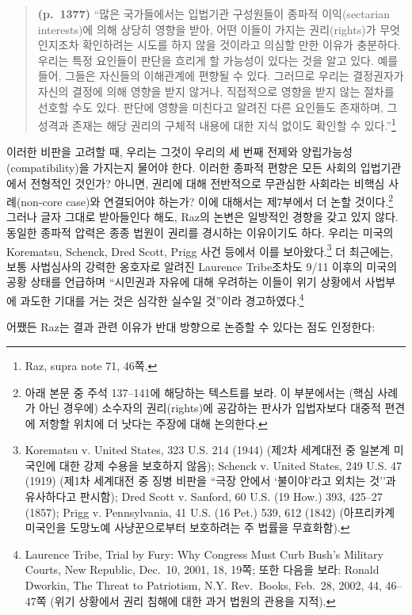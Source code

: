 \documentclass[a4paper,12pt,oneside]{article}  %
\begin{document}
\begin{quote}
\textbf{(p.~1377)} ``많은 국가들에서는 입법기관 구성원들이 종파적
이익(sectarian interests)에 의해 상당히 영향을 받아, 어떤 이들이 가지는
권리(rights)가 무엇인지조차 확인하려는 시도를 하지 않을 것이라고 의심할
만한 이유가 충분하다. 우리는 특정 요인들이 판단을 흐리게 할 가능성이
있다는 것을 알고 있다. 예를 들어, 그들은 자신들의 이해관계에 편향될 수
있다. 그러므로 우리는 결정권자가 자신의 결정에 의해 영향을 받지 않거나,
직접적으로 영향을 받지 않는 절차를 선호할 수도 있다. 판단에 영향을
미친다고 알려진 다른 요인들도 존재하며, 그 성격과 존재는 해당 권리의
구체적 내용에 대한 지식 없이도 확인할 수 있다.''\footnote{Raz, supra
  note 71, 46쪽.}
\end{quote}

이러한 비판을 고려할 때, 우리는 그것이 우리의 세 번째 전제와
양립가능성(compatibility)을 가지는지 물어야 한다. 이러한 종파적 편향은
모든 사회의 입법기관에서 전형적인 것인가? 아니면, 권리에 대해 전반적으로
무관심한 사회라는 비핵심 사례(non-core case)와 연결되어야 하는가? 이에
대해서는 제7부에서 더 논할 것이다.\footnote{아래 본문 중 주석 137--141에
  해당하는 텍스트를 보라. 이 부분에서는 (핵심 사례가 아닌 경우에)
  소수자의 권리(rights)에 공감하는 판사가 입법자보다 대중적 편견에
  저항할 위치에 더 낫다는 주장에 대해 논의한다.} 그러나 글자 그대로
받아들인다 해도, Raz의 논변은 일방적인 경향을 갖고 있지 않다. 동일한
종파적 압력은 종종 법원이 권리를 경시하는 이유이기도 하다. 우리는 미국의
Korematsu, Schenck, Dred Scott, Prigg 사건 등에서 이를
보아왔다.\footnote{Korematsu v. United States, 323 U.S. 214 (1944)
  (제2차 세계대전 중 일본계 미국인에 대한 강제 수용을 보호하지 않음);
  Schenck v. United States, 249 U.S. 47 (1919) (제1차 세계대전 중 징병
  비판을 ``극장 안에서 `불이야'라고 외치는 것''과 유사하다고 판시함);
  Dred Scott v. Sanford, 60 U.S. (19 How.) 393, 425--27 (1857); Prigg v.
  Pennsylvania, 41 U.S. (16 Pet.) 539, 612 (1842) (아프리카계 미국인을
  도망노예 사냥꾼으로부터 보호하려는 주 법률을 무효화함).} 더 최근에는,
보통 사법심사의 강력한 옹호자로 알려진 Laurence Tribe조차도 9/11 이후의
미국의 공황 상태를 언급하며 ``시민권과 자유에 대해 우려하는 이들이 위기
상황에서 사법부에 과도한 기대를 거는 것은 심각한 실수일 것''이라
경고하였다.\footnote{Laurence Tribe, Trial by Fury: Why Congress Must
  Curb Bush's Military Courts, New Republic, Dec.~10, 2001, 18, 19쪽;
  또한 다음을 보라: Ronald Dworkin, The Threat to Patriotism, N.Y.
  Rev.~Books, Feb.~28, 2002, 44, 46--47쪽 (위기 상황에서 권리 침해에
  대한 과거 법원의 관용을 지적).}

어쨌든 Raz는 결과 관련 이유가 반대 방향으로 논증할 수 있다는 점도
인정한다:
\end{document}
